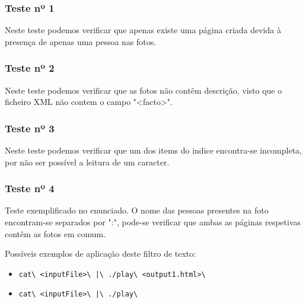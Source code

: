 \subsubsection{Teste nº 1}

Neste teste podemos verificar que apenas existe uma página criada devida à presença de apenas uma pessoa nas fotos.

\subsubsection{Teste nº 2}

Neste teste podemos verificar que as fotos não contêm descrição, visto que o ficheiro XML não contem o campo "<facto>".

\subsubsection{Teste nº 3}

Neste teste podemos verificar que um dos items do indice encontra-se incompleta, por não ser possível a leitura de um caracter.

\subsubsection{Teste nº 4}

Teste exemplificado no enunciado. O nome das pessoas presentes na foto encontram-se separados por ":", pode-se verificar que ambas as páginas respetivas contêm as fotos em comum.


Possíveis exemplos de aplicação deste filtro de texto:
\begin{itemize}
\item\verb!cat\ <inputFile>\ |\ ./play\ <output1.html>\ !
\item\verb!cat\ <inputFile>\ |\ ./play\ !
\end{itemize}